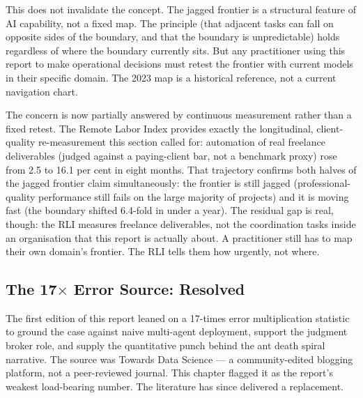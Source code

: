 This does not invalidate the concept. The jagged frontier is a structural feature of AI capability, not a fixed map. The principle (that adjacent tasks can fall on opposite sides of the boundary, and that the boundary is unpredictable) holds regardless of where the boundary currently sits. But any practitioner using this report to make operational decisions must retest the frontier with current models in their specific domain. The 2023 map is a historical reference, not a current navigation chart.

The concern is now partially answered by continuous measurement rather than a fixed retest. The Remote Labor Index \parencite{RLI2025, CAIS2026RLI} provides exactly the longitudinal, client-quality re-measurement this section called for: automation of real freelance deliverables (judged against a paying-client bar, not a benchmark proxy) rose from 2.5 to 16.1 per cent in eight months. That trajectory confirms both halves of the jagged frontier claim simultaneously: the frontier is still jagged (professional-quality performance still fails on the large majority of projects) and it is moving fast (the boundary shifted 6.4-fold in under a year). The residual gap is real, though: the RLI measures freelance deliverables, not the coordination tasks inside an organisation that this report is actually about. A practitioner still has to map their own domain's frontier. The RLI tells them how urgently, not where.

\subsection{The 17$\times$ Error Source: Resolved}

The first edition of this report leaned on a 17-times error multiplication statistic \parencite{TDS2026} to ground the case against naive multi-agent deployment, support the judgment broker role, and supply the quantitative punch behind the ant death spiral narrative. The source was Towards Data Science --- a community-edited blogging platform, not a peer-reviewed journal. This chapter flagged it as the report's weakest load-bearing number. The literature has since delivered a replacement.

